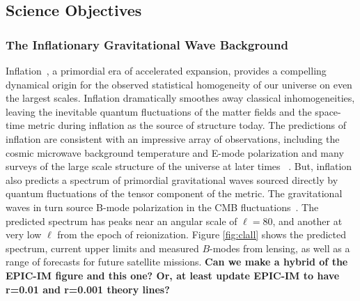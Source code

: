 
\subsection{Science Objectives}
\label{sec:science}

\vspace{-0.05in}

 
\subsubsection{The Inflationary Gravitational Wave Background}

\vspace{-0.05in}


Inflation~\cite{guth81,linde82,albrecht82,sato81,kolb94}, a primordial era of accelerated expansion, provides a compelling dynamical origin for the observed statistical homogeneity of our universe on even the largest scales. Inflation dramatically smoothes away classical inhomogeneities, leaving the inevitable quantum fluctuations of the matter fields and the space-time metric during inflation as the source of structure today.
The predictions of inflation are consistent with an impressive array of observations, including the cosmic microwave background temperature and E-mode polarization and many surveys of the large scale structure of the universe at later times ~\cite{spergel06,Tegmark:2006az,planck2015parameters,planck2015inflation}. But, inflation also predicts a spectrum of primordial gravitational waves sourced directly by quantum fluctuations of the tensor component of the metric. The gravitational waves in turn source B-mode polarization in the CMB fluctuations~\cite{kamionkowski97a,zaldarriaga97}. The predicted spectrum has peaks near an angular scale of $\ell=80$, and another at very low $\ell$ from the epoch of reionization. Figure \ref{fig:clall} shows the predicted spectrum, current upper limits and measured $B$-modes from lensing, as well as a range of forecasts for future satellite missions. {\bf Can we make a hybrid of the EPIC-IM figure and this one? Or, at least update EPIC-IM to have r=0.01 and r=0.001 theory lines?}

